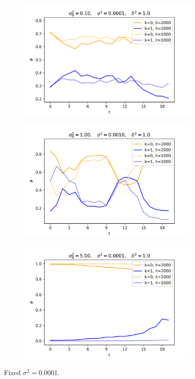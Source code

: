 \documentclass[12pt]{article}
\begin{document}
\begin{figure}[H]
  \begin{subfigure}[b]{0.33\textwidth}
    \includegraphics[width=\linewidth]{init_1E-01|basic_1E-04|prop_1E+00|it_2000|autoreg_True}
  \end{subfigure}%
  \begin{subfigure}[b]{0.33\textwidth}
    \includegraphics[width=\linewidth]{init_1E+00|basic_1E-03|prop_1E+00|it_2000|autoreg_True}
  \end{subfigure}%
  \begin{subfigure}[b]{0.33\textwidth}
    \includegraphics[width=\linewidth]{init_5E+00|basic_1E-04|prop_1E+00|it_2000|autoreg_True}
  \end{subfigure}
  \caption{Fixed $\sigma^2=0.0001$.}
\end{figure}
\end{document}
